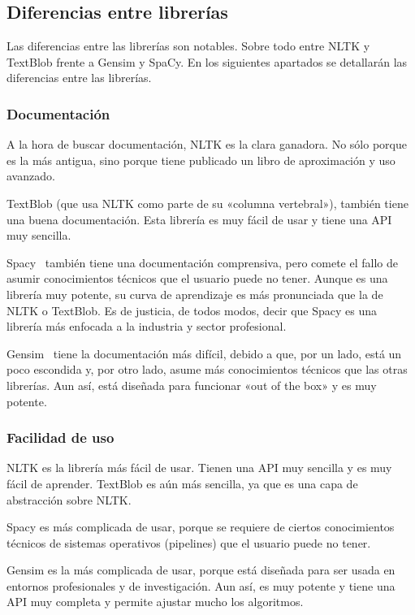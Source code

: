 \documentclass[a4paper,twocolumn]{article}
\begin{document}
    \subsection {Diferencias entre librerías}\label{subsec:diflibs}
    Las diferencias entre las librerías son notables.
    Sobre todo entre NLTK y TextBlob frente a Gensim y SpaCy.
    En los siguientes apartados se detallarán las diferencias entre las librerías.

    \subsubsection{Documentación}\label{subsubsec:doc}
    A la hora de buscar documentación, NLTK es la clara ganadora.
    No sólo porque es la más antigua, sino porque tiene publicado un libro de aproximación y uso avanzado\cite{bird2009natural}.

    TextBlob (que usa NLTK como parte de su «columna vertebral»), también tiene una buena documentación\cite{textblobdocs}.
    Esta librería es muy fácil de usar y tiene una API muy sencilla.

    Spacy~\cite{spacydocs} también tiene una documentación comprensiva, pero comete el fallo de asumir conocimientos técnicos que el usuario puede no tener.
    Aunque es una librería muy potente, su curva de aprendizaje es más pronunciada que la de NLTK o TextBlob.
    Es de justicia, de todos modos, decir que Spacy es una librería más enfocada a la industria y sector profesional.

    Gensim~\cite{gensimdocs} tiene la documentación más difícil, debido a que, por un lado, está un poco escondida y, por otro lado, asume más conocimientos técnicos que las otras librerías.
    Aun así, está diseñada para funcionar «out of the box» y es muy potente.

    \subsubsection{Facilidad de uso}\label{subsubsec:facilidad}

    NLTK es la librería más fácil de usar.
    Tienen una API muy sencilla y es muy fácil de aprender.
    TextBlob es aún más sencilla, ya que es una capa de abstracción sobre NLTK\@.

    Spacy es más complicada de usar, porque se requiere de ciertos conocimientos técnicos de sistemas operativos (pipelines) que el usuario puede no tener.

    Gensim es la más complicada de usar, porque está diseñada para ser usada en entornos profesionales y de investigación.
    Aun así, es muy potente y tiene una API muy completa y permite ajustar mucho los algoritmos.
\end{document}
